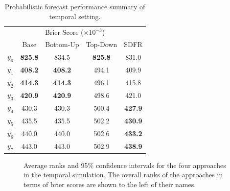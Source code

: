 \documentclass[a4paper,review,12pt,authoryear]{elsarticle}
\begin{document}
     \begin{table}
     \centering
     \caption{\label{tab:sim_temporal_res_dist} Probabilistic forecast performance summary of temporal setting.}
     \begin{tabular}{lcccc}
     \toprule
     \multicolumn{5}{c}{Brier Score ($\times 10^{-3}$)}\\ 
      & Base & Bottom-Up & Top-Down & SDFR \\\midrule
     $y_0$ & \textbf{825.8} & 834.5          & \textbf{825.8} & 831.0\\
     $y_1$ & \textbf{408.2} & \textbf{408.2} & 494.1 & 409.9 \\
     $y_2$ & \textbf{414.3} & \textbf{414.3} & 496.1 & 415.8\\
     $y_3$ & \textbf{420.9} & \textbf{420.9} & 498.6 & 421.0\\
     $y_4$ & 430.3 & 430.3  & 500.4          & \textbf{427.9}\\
     $y_5$ & 435.5 & 435.5  & 502.2          & \textbf{430.9} \\
     $y_6$ & 440.0 & 440.0  & 502.6          & \textbf{433.2} \\
     $y_7$ & 443.0 & 443.0  & 502.9          & \textbf{438.9} \\
     \bottomrule
     \end{tabular}
     \end{table}
     
     
     \begin{figure}
       \caption{\label{fig:sim_temporal_mcb_prob}Average ranks and 95\% confidence intervals for the four approaches in the temporal simulation. The overall ranks of the approaches in terms of brier scores are shown to the left of their names.}
        \qquad
        \qquad
     \end{figure}     
\end{document}
